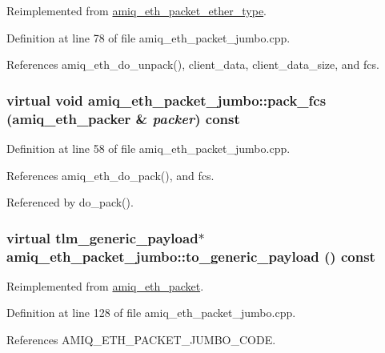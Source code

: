 Reimplemented from \hyperlink{classamiq__eth__packet__ether__type_a0c86ef80c46bbed384739b23e5efb0ef}{amiq\_\-eth\_\-packet\_\-ether\_\-type}.

Definition at line 78 of file amiq\_\-eth\_\-packet\_\-jumbo.cpp.

References amiq\_\-eth\_\-do\_\-unpack(), client\_\-data, client\_\-data\_\-size, and fcs.\hypertarget{classamiq__eth__packet__jumbo_ab53103b74f5b88bd563c647ef28b088e}{
\subsubsection[{pack\_\-fcs}]{\setlength{\rightskip}{0pt plus 5cm}virtual void amiq\_\-eth\_\-packet\_\-jumbo::pack\_\-fcs ({\bf amiq\_\-eth\_\-packer} \& {\em packer}) const}}
\label{classamiq__eth__packet__jumbo_ab53103b74f5b88bd563c647ef28b088e}


Definition at line 58 of file amiq\_\-eth\_\-packet\_\-jumbo.cpp.

References amiq\_\-eth\_\-do\_\-pack(), and fcs.

Referenced by do\_\-pack().\hypertarget{classamiq__eth__packet__jumbo_a3d838f8920b63ead671eaab21483d74f}{
\subsubsection[{to\_\-generic\_\-payload}]{\setlength{\rightskip}{0pt plus 5cm}virtual tlm\_\-generic\_\-payload$\ast$ amiq\_\-eth\_\-packet\_\-jumbo::to\_\-generic\_\-payload () const}}
\label{classamiq__eth__packet__jumbo_a3d838f8920b63ead671eaab21483d74f}


Reimplemented from \hyperlink{classamiq__eth__packet_a6dd92751d8172eeaa347d71bb415b0d5}{amiq\_\-eth\_\-packet}.

Definition at line 128 of file amiq\_\-eth\_\-packet\_\-jumbo.cpp.

References AMIQ\_\-ETH\_\-PACKET\_\-JUMBO\_\-CODE.

